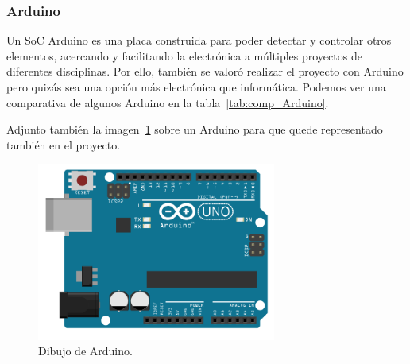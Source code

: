 \subsubsection{Arduino}\label{4:Arduino}

Un SoC Arduino es una placa construida para poder detectar y controlar otros elementos, acercando y facilitando la electrónica a múltiples proyectos de diferentes disciplinas. Por ello, también se valoró realizar el proyecto con Arduino pero quizás sea una opción más electrónica que informática.
Podemos ver una comparativa de algunos Arduino en la tabla~\ref{tab:comp_Arduino}.

Adjunto también la imagen~\ref{Img:Arduino} sobre un Arduino para que quede representado también en el proyecto.

\begin{figure}
    \centering
    \includegraphics[width=0.7\textwidth]{img/Diagramas/arduinoUno.PNG}
    \caption{Dibujo de Arduino.} \label{Img:Arduino}
\end{figure}



